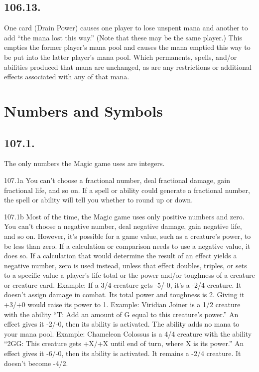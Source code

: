 \subsection*{106.13.}
One card (Drain Power) causes one player to lose unspent mana and another to add “the mana lost this way.” (Note that these may be the same player.) This empties the former player’s mana pool and causes the mana emptied this way to be put into the latter player’s mana pool. Which permanents, spells, and/or abilities produced that mana are unchanged, as are any restrictions or additional effects associated with any of that mana.

\section{Numbers and Symbols}
\subsection*{107.1.}
The only numbers the Magic game uses are integers.

107.1a You can’t choose a fractional number, deal fractional damage, gain fractional life, and so on. If a spell or ability could generate a fractional number, the spell or ability will tell you whether to round up or down.

107.1b Most of the time, the Magic game uses only positive numbers and zero. You can’t choose a negative number, deal negative damage, gain negative life, and so on. However, it’s possible for a game value, such as a creature’s power, to be less than zero. If a calculation or comparison needs to use a negative value, it does so. If a calculation that would determine the result of an effect yields a negative number, zero is used instead, unless that effect doubles, triples, or sets to a specific value a player’s life total or the power and/or toughness of a creature or creature card.
Example: If a 3/4 creature gets -5/-0, it’s a -2/4 creature. It doesn’t assign damage in combat. Its total power and toughness is 2. Giving it +3/+0 would raise its power to 1.
Example: Viridian Joiner is a 1/2 creature with the ability “{T}: Add an amount of {G} equal to this creature’s power.” An effect gives it -2/-0, then its ability is activated. The ability adds no mana to your mana pool.
Example: Chameleon Colossus is a 4/4 creature with the ability “{2}{G}{G}: This creature gets +X/+X until end of turn, where X is its power.” An effect gives it -6/-0, then its ability is activated. It remains a -2/4 creature. It doesn’t become -4/2.

